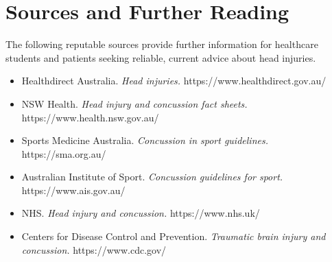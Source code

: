\section*{Sources and Further Reading}
The following reputable sources provide further information for healthcare students and patients seeking reliable, current advice about head injuries.

\begin{itemize}
    \item Healthdirect Australia. \textit{Head injuries.} https://www.healthdirect.gov.au/
    \item NSW Health. \textit{Head injury and concussion fact sheets.} https://www.health.nsw.gov.au/
    \item Sports Medicine Australia. \textit{Concussion in sport guidelines.} https://sma.org.au/
    \item Australian Institute of Sport. \textit{Concussion guidelines for sport.} https://www.ais.gov.au/
    \item NHS. \textit{Head injury and concussion.} https://www.nhs.uk/
    \item Centers for Disease Control and Prevention. \textit{Traumatic brain injury and concussion.} https://www.cdc.gov/
\end{itemize}
